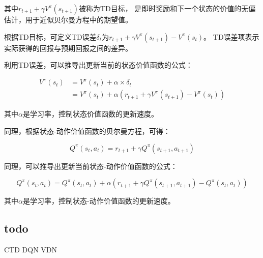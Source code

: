 \documentclass[UTF8]{ctexart}
\begin{document}
其中$r_{t+1} + \gamma V^{\pi}(s_{t+1})$被称为TD目标，
是即时奖励和下一个状态的价值的无偏估计，用于近似贝尔曼方程中的期望值。

根据TD目标，可定义TD误差$\delta_t$为$r_{t+1} + \gamma V^{\pi}(s_{t+1}) - V^{\pi}(s_t)$。
TD误差项表示实际获得的回报与预期回报之间的差异。

利用TD误差，可以推导出更新当前的状态价值函数的公式：

\begin{align*}
	V^{\pi}(s_t) &= V^{\pi}(s_t) + \alpha \times \delta_t  \\
	&= V^{\pi}(s_t) + \alpha (r_{t+1} + \gamma V^{\pi}(s_{t+1}) - V^{\pi}(s_t))
\end{align*}

其中$\alpha$是学习率，控制状态价值函数的更新速度。

同理，根据状态-动作价值函数的贝尔曼方程，可得：

$$Q^{\pi}(s_t, a_t) = r_{t+1} + \gamma Q^{\pi}(s_{t+1}, a_{t+1})$$

同理，可以推导出更新当前状态-动作价值函数的公式：

$$
Q^{\pi}(s_t, a_t) = Q^{\pi}(s_t, a_t) + \alpha (r_{t+1} + \gamma Q^{\pi}(s_{t+1}, a_{t+1}) - Q^{\pi}(s_t, a_t))
$$

其中$\alpha$是学习率，控制状态-动作价值函数的更新速度。

\subsection{todo}

CTD DQN VDN

	
	
\end{document}
